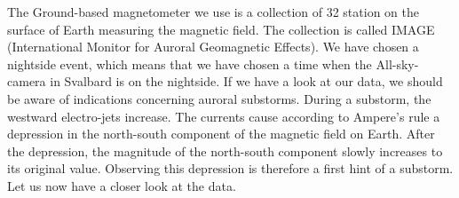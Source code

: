 \documentclass[10pt,a4paper]{article}
\begin{document}
The Ground-based magnetometer we use is a collection of 32 station on the surface of Earth measuring the magnetic field. The collection is called 
IMAGE (International Monitor for Auroral Geomagnetic Effects). We have chosen a nightside event, which means that we have chosen a time when the All-sky-camera 
in Svalbard is on the nightside. If we have a look at our data, we should be aware of indications concerning auroral substorms. During a substorm, 
the westward electro-jets increase. The currents cause according to Ampere's rule a depression in the north-south component of the magnetic field on Earth. 
After the depression, the magnitude of the north-south component slowly increases to its original value.
Observing this depression is therefore a first hint of a substorm. Let us now have a closer look at the data. 
\end{document}
